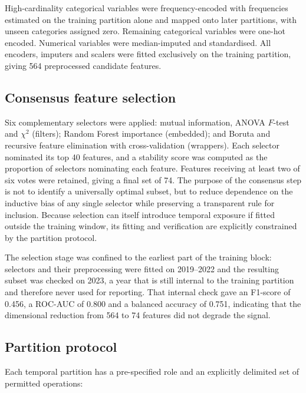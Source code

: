 \documentclass[sn-vancouver,Numbered]{sn-jnl}
\begin{document}
High-cardinality categorical variables were frequency-encoded with frequencies estimated on the training partition alone and mapped onto later partitions, with unseen categories assigned zero. Remaining categorical variables were one-hot encoded. Numerical variables were median-imputed and standardised. All encoders, imputers and scalers were fitted exclusively on the training partition, giving 564 preprocessed candidate features.

\subsection{Consensus feature selection}\label{sec:selection}

Six complementary selectors were applied: mutual information, ANOVA $F$-test and $\chi^2$ (filters); Random Forest importance (embedded); and Boruta \cite{kursa_feature_2010} and recursive feature elimination with cross-validation (wrappers). Each selector nominated its top 40 features, and a stability score was computed as the proportion of selectors nominating each feature. Features receiving at least two of six votes were retained, giving a final set of 74. The purpose of the consensus step is not to identify a universally optimal subset, but to reduce dependence on the inductive bias of any single selector while preserving a transparent rule for inclusion. Because selection can itself introduce temporal exposure if fitted outside the training window, its fitting and verification are explicitly constrained by the partition protocol.

The selection stage was confined to the earliest part of the training block: selectors and their preprocessing were fitted on 2019--2022 and the resulting subset was checked on 2023, a year that is still internal to the training partition and therefore never used for reporting. That internal check gave an F1-score of 0.456, a ROC-AUC of 0.800 and a balanced accuracy of 0.751, indicating that the dimensional reduction from 564 to 74 features did not degrade the signal.

\subsection{Partition protocol}\label{sec:protocol}

Each temporal partition has a pre-specified role and an explicitly delimited set of permitted operations:
\end{document}
